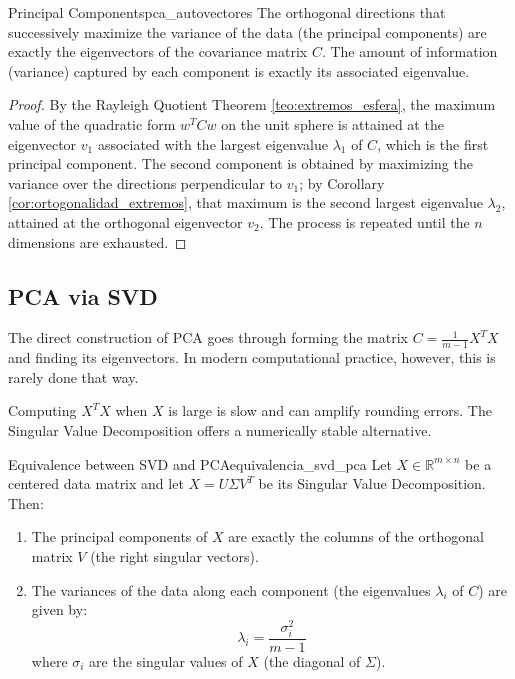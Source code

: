 \documentclass[11pt, a4paper]{article}
\begin{document}
\begin{proposicion}{Principal Components}{pca_autovectores}
The orthogonal directions that successively maximize the variance of the data (the principal components) are exactly the eigenvectors of the covariance matrix $C$. The amount of information (variance) captured by each component is exactly its associated eigenvalue.
\end{proposicion}

\begin{proof}
By the Rayleigh Quotient Theorem \ref{teo:extremos_esfera}, the maximum value of the quadratic form $w^T C w$ on the unit sphere is attained at the eigenvector $v_1$ associated with the largest eigenvalue $\lambda_1$ of $C$, which is the first principal component. The second component is obtained by maximizing the variance over the directions perpendicular to $v_1$; by Corollary \ref{cor:ortogonalidad_extremos}, that maximum is the second largest eigenvalue $\lambda_2$, attained at the orthogonal eigenvector $v_2$. The process is repeated until the $n$ dimensions are exhausted.
\end{proof}

\subsection{PCA via SVD}

The direct construction of PCA goes through forming the matrix $C = \frac{1}{m-1} X^T X$ and finding its eigenvectors. In modern computational practice, however, this is rarely done that way.

Computing $X^T X$ when $X$ is large is slow and can amplify rounding errors. The Singular Value Decomposition offers a numerically stable alternative.

\begin{teorema}{Equivalence between SVD and PCA}{equivalencia_svd_pca}
Let $X \in \mathbb{R}^{m \times n}$ be a centered data matrix and let $X = U \Sigma V^T$ be its Singular Value Decomposition. Then:
\begin{enumerate}
    \item[i)] The principal components of $X$ are exactly the columns of the orthogonal matrix $V$ (the right singular vectors).
    \item[ii)] The variances of the data along each component (the eigenvalues $\lambda_i$ of $C$) are given by:
    \[ \lambda_i = \frac{\sigma_i^2}{m-1} \]
    where $\sigma_i$ are the singular values of $X$ (the diagonal of $\Sigma$).
\end{enumerate}
\end{teorema}
\end{document}
